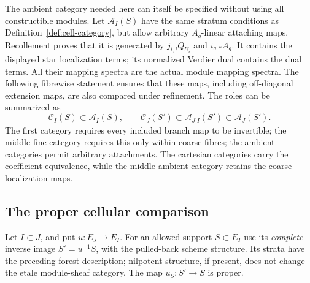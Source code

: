 \documentclass[11pt]{article}
\theoremstyle{definition}
\theoremstyle{remark}
\begin{document}
The ambient category needed here can itself be specified without using
all constructible modules.  Let $\mathcal A_I(S)$ have the same stratum
conditions as Definition~\ref{def:cell-category}, but allow arbitrary
$A_q$-linear attaching maps.  Recollement proves that it is generated
by $j_{i,!}Q_{U_i}$ and $i_{q,*}A_q$.  It contains the displayed star
localization terms; its normalized Verdier dual contains the dual
terms.  All their mapping spectra are the actual module mapping
spectra.  The following fibrewise statement ensures that these maps,
including off-diagonal extension maps, are also compared under
refinement.
The roles can be summarized as
\[
 \mathcal C_I(S)\subset\mathcal A_I(S),\qquad
 \mathcal C_J(S')\subset\mathcal A_{J|I}(S')\subset\mathcal A_J(S').
\]
The first category requires every included branch map to be invertible;
the middle fine category requires this only within coarse fibres;
the ambient categories permit arbitrary attachments.  The cartesian
categories carry the coefficient equivalence, while the middle
ambient category retains the coarse localization maps.

\subsection{The proper cellular comparison}
Let $I\subset J$, and put $u:E_J\to E_I$.  For an allowed support
$S\subset E_I$ use its \emph{complete} inverse image $S'=u^{-1}S$,
with the pulled-back scheme structure.  Its strata have the preceding
forest description; nilpotent structure, if present, does not change
the etale module-sheaf category.  The map $u_S:S'\to S$ is proper.
\end{document}

